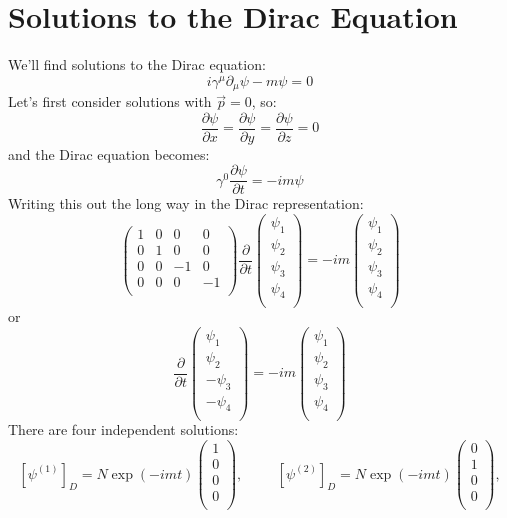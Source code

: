 \documentclass[12pt]{article}
\begin{document}
\section{Solutions to the Dirac Equation}

We'll find solutions to the Dirac equation:
$$i \gamma^\mu \partial_\mu \psi -m \psi = 0$$
Let's first consider solutions with $\vec{p}=0$, so:
$$\frac{\partial\psi}{\partial x} = \frac{\partial\psi}{\partial y} = \frac{\partial\psi}{\partial z} = 0$$
and the Dirac equation becomes:
$$\gamma^0 \frac{\partial \psi}{\partial t} = -i m \psi $$
Writing this out the long way in the Dirac representation:
$$
\begin{pmatrix}
1 & 0 & 0 & 0\\
0 & 1 & 0 & 0\\
0 & 0 &-1 & 0\\
0 & 0 & 0 &-1\\
\end{pmatrix}
\frac{\partial}{\partial t}
\begin{pmatrix}
\psi_1\\
\psi_2\\
\psi_3\\
\psi_4\\
\end{pmatrix}
=
-i m
\begin{pmatrix}
\psi_1\\
\psi_2\\
\psi_3\\
\psi_4\\
\end{pmatrix}
$$
or
$$
\frac{\partial}{\partial t}
\begin{pmatrix}
\psi_1\\
\psi_2\\
-\psi_3\\
-\psi_4\\
\end{pmatrix}
=
-i m
\begin{pmatrix}
\psi_1\\
\psi_2\\
\psi_3\\
\psi_4\\
\end{pmatrix}
$$
There are four independent solutions:
$$
[\psi^{(1)}]_D = N \exp\left(- i m t\right)
\begin{pmatrix}
1\\
0\\
0\\
0\\
\end{pmatrix},
\hspace{1cm}
[\psi^{(2)}]_D = N \exp\left(- i m t\right)
\begin{pmatrix}
0\\
1\\
0\\
0\\
\end{pmatrix},
$$
\end{document}
